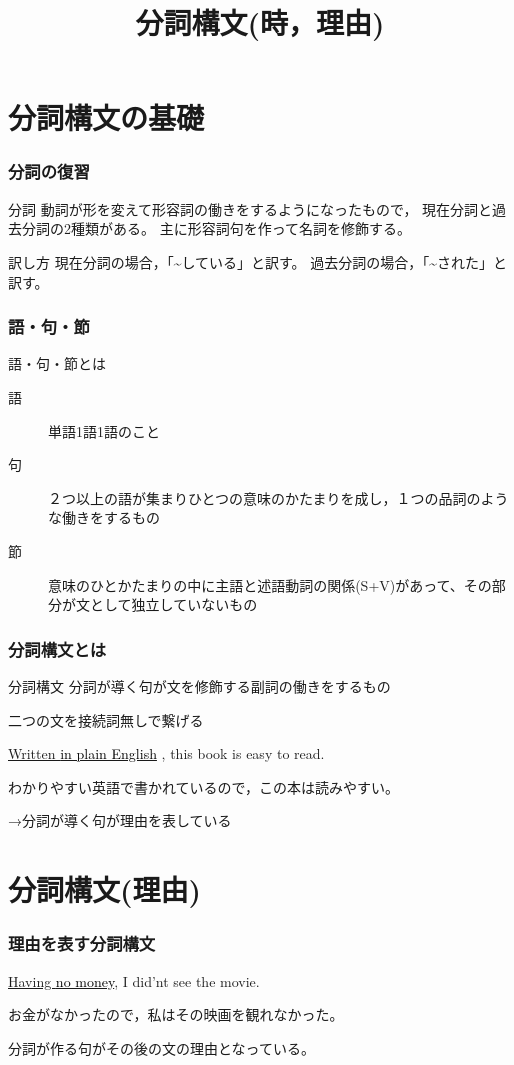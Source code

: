\documentclass[xcolor=dvipsnames,unicode,14pt]{beamer}%
\title{分詞構文(時，理由)}
\begin{document}
\frame{\maketitle}

\begin{frame}
  \tableofcontents
\end{frame}
\section{分詞構文の基礎}
\begin{frame}
  \frametitle{分詞の復習}
  \begin{block}{分詞}
    動詞が形を変えて形容詞の働きをするようになったもので，
    現在分詞と過去分詞の2種類がある。
    主に形容詞句を作って名詞を修飾する。
  \end{block}
  \begin{block}{訳し方}
    現在分詞の場合，「\textasciitilde している」と訳す。
    過去分詞の場合，「\textasciitilde された」と訳す。
  \end{block}
\end{frame}

\begin{frame}
  \frametitle{語・句・節}
  語・句・節とは
  \pause
  \begin{description}
    \item[語] 単語1語1語のこと
    \item[句] ２つ以上の語が集まりひとつの意味のかたまりを成し，１つの品詞のような働きをするもの
    \item[節] 意味のひとかたまりの中に主語と述語動詞の関係(S+V)があって、その部分が文として独立していないもの
  \end{description}
  \pause

\end{frame}
\begin{frame}
  \frametitle{分詞構文とは}

  \begin{block}{分詞構文}
    分詞が導く句が文を修飾する副詞の働きをするもの

    二つの文を接続詞無しで繋げる
  \end{block} 
  \textcolor{NavyBlue}{\underline{Written \textcolor{black}{in plain English}}} , this book is easy to read. 

  わかりやすい英語で書かれているので，この本は読みやすい。

  →分詞が導く句が理由を表している

\end{frame}

\section{分詞構文(理由)}
\begin{frame}
  \frametitle{理由を表す分詞構文}

  \textcolor{NavyBlue}{\underline{Having \textcolor{black}{no money}}}, I did'nt see the movie.

  お金がなかったので，私はその映画を観れなかった。

  分詞が作る句がその後の文の理由となっている。



\end{frame}
\end{document}
